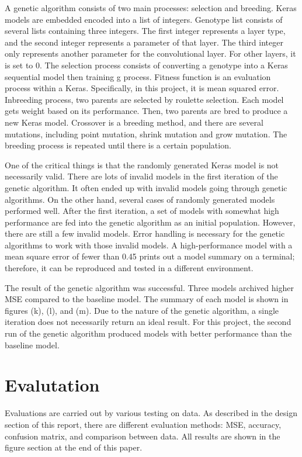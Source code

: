 \documentclass[11pt, natbib=false]{article}
\begin{document}
A genetic algorithm consists of two main processes: selection and breeding.
Keras models are embedded encoded into a list of integers.
Genotype list consists of several lists containing three integers.
The first integer represents a layer type, and the second integer represents a parameter of that layer.
The third integer only represents another parameter for the convolutional layer.
For other layers, it is set to 0.
The selection process consists of converting a genotype into a Keras sequential model then training g process.
Fitness function is an evaluation process within a Keras.
Specifically, in this project, it is mean squared error.
Inbreeding process, two parents are selected by roulette selection.
Each model gets weight based on its performance.
Then, two parents are bred to produce a new Keras model.
Crossover is a breeding method, and there are several mutations, including point mutation, shrink mutation and grow mutation.
The breeding process is repeated until there is a certain population.

One of the critical things is that the randomly generated Keras model is not necessarily valid.
There are lots of invalid models in the first iteration of the genetic algorithm.
It often ended up with invalid models going through genetic algorithms. On the other hand, several cases of randomly generated models performed well.
After the first iteration, a set of models with somewhat high performance are fed into the genetic algorithm as an initial population.
However, there are still a few invalid models.
Error handling is necessary for the genetic algorithms to work with those invalid models.
A high-performance model with a mean square error of fewer than 0.45 prints out a model summary on a terminal; therefore, it can be reproduced and tested in a different environment.

The result of the genetic algorithm was successful.
Three models archived higher MSE compared to the baseline model.
The summary of each model is shown in figures (k), (l), and (m).
Due to the nature of the genetic algorithm, a single iteration does not necessarily return an ideal result.
For this project, the second run of the genetic algorithm produced models with better performance than the baseline model.


\section{Evalutation}
Evaluations are carried out by various testing on data.
As described in the design section of this report, there are different evaluation methods: MSE, accuracy, confusion matrix, and comparison between data.
All results are shown in the figure section at the end of this paper.
\end{document}
